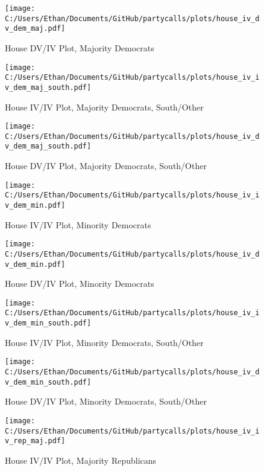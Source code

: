 \documentclass[12pt]{article}
\begin{document}
\begin{figure}[H]
	\centering
	\caption{House DV/IV Plot, Majority Democrats}
	\texttt{[image: C:/Users/Ethan/Documents/GitHub/partycalls/plots/house\_iv\_dv\_dem\_maj.pdf]}
\end{figure}

\begin{figure}[H]
	\centering
	\caption{House IV/IV Plot, Majority Democrats, South/Other}
	\texttt{[image: C:/Users/Ethan/Documents/GitHub/partycalls/plots/house\_iv\_iv\_dem\_maj\_south.pdf]}
\end{figure}

\begin{figure}[H]
	\centering
	\caption{House DV/IV Plot, Majority Democrats, South/Other}
	\texttt{[image: C:/Users/Ethan/Documents/GitHub/partycalls/plots/house\_iv\_dv\_dem\_maj\_south.pdf]}
\end{figure}

\begin{figure}[H]
	\centering
	\caption{House IV/IV Plot, Minority Democrats}
	\texttt{[image: C:/Users/Ethan/Documents/GitHub/partycalls/plots/house\_iv\_iv\_dem\_min.pdf]}
\end{figure}

\begin{figure}[H]
	\centering
	\caption{House DV/IV Plot, Minority Democrats}
	\texttt{[image: C:/Users/Ethan/Documents/GitHub/partycalls/plots/house\_iv\_dv\_dem\_min.pdf]}
\end{figure}

\begin{figure}[H]
	\centering
	\caption{House IV/IV Plot, Minority Democrats, South/Other}
	\texttt{[image: C:/Users/Ethan/Documents/GitHub/partycalls/plots/house\_iv\_iv\_dem\_min\_south.pdf]}
\end{figure}

\begin{figure}[H]
	\centering
	\caption{House DV/IV Plot, Minority Democrats, South/Other}
	\texttt{[image: C:/Users/Ethan/Documents/GitHub/partycalls/plots/house\_iv\_dv\_dem\_min\_south.pdf]}
\end{figure}

\begin{figure}[H]
	\centering
	\caption{House IV/IV Plot, Majority Republicans}
	\texttt{[image: C:/Users/Ethan/Documents/GitHub/partycalls/plots/house\_iv\_iv\_rep\_maj.pdf]}
\end{figure}
\end{document}
